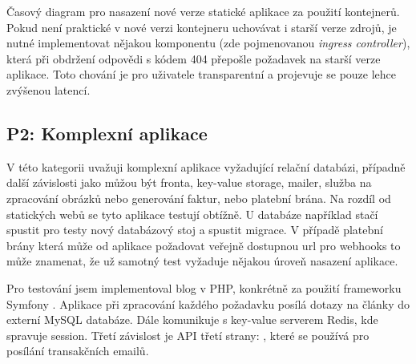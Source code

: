         \begin{iffigure}
            \centering
            \caption{Časový diagram pro nasazení nové verze statické aplikace za použití kontejnerů. Pokud není praktické v nové verzi kontejneru uchovávat i starší verze zdrojů, je nutné implementovat nějakou komponentu (zde pojmenovanou \textit{ingress controller}), která při obdržení odpovědi s  kódem 404 přepošle požadavek na starší verze aplikace. Toto chování je pro uživatele transparentní a projevuje se pouze lehce zvýšenou latencí.}
            \label{fig:static-deploy-container}
        \end{iffigure}

    \subsection{P2: Komplexní aplikace}
        V této kategorii uvažuji komplexní aplikace vyžadující relační databázi, případně další závislosti jako můžou být fronta, key-value storage, mailer, služba na zpracování obrázků nebo generování faktur, nebo platební brána. Na rozdíl od statických webů se tyto aplikace testují obtížně.
        U databáze například stačí spustit pro testy nový databázový stoj a spustit migrace. V případě platební brány která může od aplikace požadovat veřejně dostupnou url pro webhooks to může znamenat, že už samotný test vyžaduje nějakou úroveň nasazení aplikace.

        Pro testování jsem implementoval blog v PHP, konkrétně za použití frameworku Symfony \cite{symfony}. Aplikace při zpracování každého požadavku posílá dotazy na články do externí MySQL databáze. Dále komunikuje s key-value serverem Redis, kde spravuje session. Třetí závislost je API třetí strany: , které se používá pro posílání transakčních emailů.

